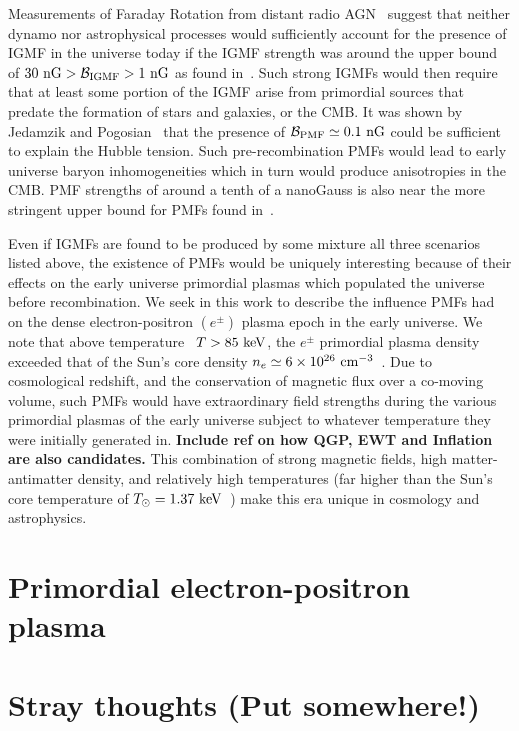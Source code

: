 \documentclass[a4paper]{article}
\begin{document}
Measurements of Faraday Rotation from distant radio AGN~\cite{pomakov2022redshift} suggest that neither dynamo nor astrophysical processes would sufficiently account for the presence of IGMF in the universe today if the IGMF strength was around the upper bound of $30{\rm\ nG}>{\cal B}_{\rm IGMF}>1{\rm\ nG}$ as found in~\cite{vernstrom2021discovery}. Such strong IGMFs would then require that at least some portion of the IGMF arise from primordial sources that predate the formation of stars and galaxies, or the CMB. It was shown by Jedamzik and Pogosian~\cite{jedamzik2020relieving} that the presence of ${\cal B}_{\rm PMF}\simeq0.1{\rm\ nG}$ could be sufficient to explain the Hubble tension. Such pre-recombination PMFs would lead to early universe baryon inhomogeneities which in turn would produce anisotropies in the CMB. PMF strengths of around a tenth of a nanoGauss is also near the more stringent upper bound for PMFs found in~\cite{jedamzik2019stringent}.

Even if IGMFs are found to be produced by some mixture all three scenarios listed above, the existence of PMFs would be uniquely interesting because of their effects on the early universe primordial plasmas which populated the universe before recombination. We seek in this work to describe the influence PMFs had on the dense electron-positron $(e^{\pm})$ plasma epoch in the early universe. We note that above temperature~\cite{rafelski2023short} $T>85\text{ keV}$, the $e^{\pm}$ primordial plasma density exceeded that of the Sun's core density $n_{e}\simeq6\times10^{26}{\rm\ cm}^{-3}$~\cite{bahcall2001solar}. Due to cosmological redshift, and the conservation of magnetic flux over a co-moving volume, such PMFs would have extraordinary field strengths during the various primordial plasmas of the early universe subject to whatever temperature they were initially generated in. \textbf{Include ref on how QGP, EWT and Inflation are also candidates.} This combination of strong magnetic fields, high matter-antimatter density, and relatively high temperatures (far higher than the Sun's core temperature of $T_{\odot}=1.37\text{ keV}$~\cite{castellani1997solar}) make this era unique in cosmology and astrophysics.

\section{Primordial electron-positron plasma}\label{sec:ElectronPositron}

\section{Stray thoughts (Put somewhere!)}
\end{document}
